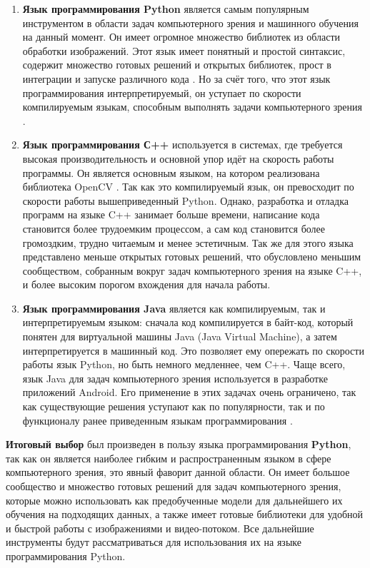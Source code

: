 \documentclass[a4paper,12pt]{article}
\begin{document}
\begin{enumerate}
    \item \textbf{Язык программирования Python} является самым популярным инструментом в области задач компьютерного зрения и машинного обучения на данный момент. Он имеет огромное множество библиотек из области обработки изображений. Этот язык имеет понятный и простой синтаксис, содержит множество готовых решений и открытых библиотек, прост в интеграции и запуске различного кода \cite{solem}. Но за счёт того, что этот язык программирования интерпретируемый, он уступает по скорости компилируемым языкам, способным выполнять задачи компьютерного зрения \cite{python}. 
    \item \textbf{Язык программирования С++} используется в системах, где требуется высокая производительность и основной упор идёт на скорость работы программы. Он является основным языком, на котором реализована библиотека OpenCV \cite{c++_cv}. Так как это компилируемый язык, он превосходит по скорости работы вышеприведенный Python. Однако, разработка и отладка программ на языке C++ занимает больше времени, написание кода становится более трудоемким процессом, а сам код становится более громоздким, трудно читаемым и менее эстетичным. Так же для этого языка представлено меньше открытых готовых решений, что обусловлено меньшим сообществом, собранным вокруг задач компьютерного зрения на языке C++, и более высоким порогом вхождения для начала работы. 
    \item \textbf{Язык программирования Java} является как компилируемым, так и интерпретируемым языком: сначала код компилируется в байт-код, который понятен для виртуальной машины Java (Java Virtual Machine), а затем интерпретируется в машинный код. Это позволяет ему опережать по скорости работы язык Python, но быть немного медленнее, чем C++. Чаще всего, язык Java для задач компьютерного зрения используется в разработке приложений Android. Его применение в этих задачах очень ограничено, так как существующие решения уступают как по популярности, так и по функционалу ранее приведенным языкам программирования \cite{javacv}. 
\end{enumerate}

\textbf{Итоговый выбор} был произведен в пользу языка программирования \textbf{Python}, так как он является наиболее гибким и распространенным языком в сфере компьютерного зрения, это явный фаворит данной области. Он имеет большое сообщество и множество готовых решений для задач компьютерного зрения, которые можно использовать как предобученные модели для дальнейшего их обучения на подходящих данных, а также имеет готовые библиотеки для удобной и быстрой работы с изображениями и видео-потоком. 
Все дальнейшие инструменты будут рассматриваться для использования их на языке программирования Python.
\end{document}
